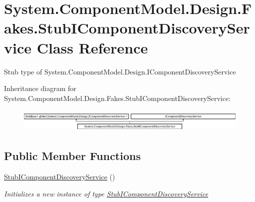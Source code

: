 \hypertarget{class_system_1_1_component_model_1_1_design_1_1_fakes_1_1_stub_i_component_discovery_service}{\section{System.\-Component\-Model.\-Design.\-Fakes.\-Stub\-I\-Component\-Discovery\-Service Class Reference}
\label{class_system_1_1_component_model_1_1_design_1_1_fakes_1_1_stub_i_component_discovery_service}
}


Stub type of System.\-Component\-Model.\-Design.\-I\-Component\-Discovery\-Service 


Inheritance diagram for System.\-Component\-Model.\-Design.\-Fakes.\-Stub\-I\-Component\-Discovery\-Service\-:\begin{figure}[H]
\begin{center}
\leavevmode
\includegraphics[height=1.138211cm]{class_system_1_1_component_model_1_1_design_1_1_fakes_1_1_stub_i_component_discovery_service}
\end{center}
\end{figure}
\subsection*{Public Member Functions}
\begin{DoxyCompactItemize}
\item 
\hyperlink{class_system_1_1_component_model_1_1_design_1_1_fakes_1_1_stub_i_component_discovery_service_a63b8efbd3605895355848f3958432d62}{Stub\-I\-Component\-Discovery\-Service} ()
\begin{DoxyCompactList}\small\item\em Initializes a new instance of type \hyperlink{class_system_1_1_component_model_1_1_design_1_1_fakes_1_1_stub_i_component_discovery_service}{Stub\-I\-Component\-Discovery\-Service}\end{DoxyCompactList}\end{DoxyCompactItemize}
